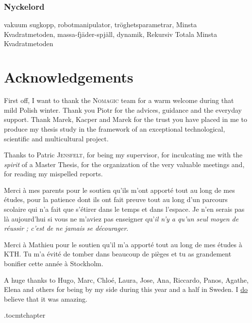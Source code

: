 \documentclass[/home/francois/latex/report/main.tex]{subfiles}
\begin{document}
\subsection*{Nyckelord}

vakuum sugkopp, robotmanipulator, tröghetsparametrar, Minsta Kvadratmetoden, massa-fjäder-spjäll, dynamik, Rekursiv Totala Minsta Kvadratmetoden

\newpage
\thispagestyle{plain}
\chapter*{Acknowledgements}

First off, I want to thank the \textsc{Nomagic} team for a warm welcome during that mild Polish winter. Thank you Piotr for the advices, guidance and the everyday support. Thank Marek, Kacper and Marek for the trust you have placed in me to produce my thesis study in the framework of an exceptional technological, scientific and multicultural project.

Thanks to Patric \textsc{Jensfelt}, for being my supervisor, for inculcating me with the \textit{spirit} of a Master Thesis, for the organization of the very valuable meetings and, for reading my mispelled reports.

Merci à mes parents pour le soutien qu'ils m'ont apporté tout au long de mes études, pour la patience dont ils ont fait preuve tout au long d'un parcours scolaire qui n'a fait que s'étirer dans le temps et dans l'espace. Je n'en serais pas là aujourd'hui si vous ne m'aviez pas enseigner qu'\textit{il n'y a qu'un seul moyen de réussir ; c'est de ne jamais se décourager}.

Merci à Mathieu pour le soutien qu'il m'a apporté tout au long de mes études à KTH. Tu m'a évité de tomber dans beaucoup de pièges et tu as grandement bonifier cette année à Stockholm.

A huge thanks to Hugo, Marc, Chloé, Laura, Jose, Ana, Riccardo, Panos, Agathe, Elena and others for being by my side during this year and a half in Sweden. I \underline{do} believe that it was amazing.



\newpage



\newpage

\etocdepthtag.toc{mtchapter}
\thispagestyle{plain}
\tableofcontents

\newpage
\end{document}
